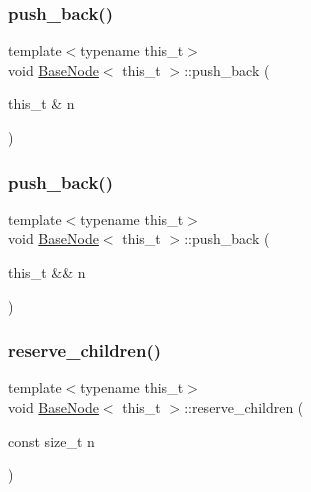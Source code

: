 \subsubsection{\texorpdfstring{push\+\_\+back()}{push\_back()}\hspace{0.1cm}{\footnotesize\ttfamily [1/2]}}
{\footnotesize\ttfamily template$<$typename this\+\_\+t$>$ \\
void \hyperlink{class_base_node}{Base\+Node}$<$ this\+\_\+t $>$\+::push\+\_\+back (\begin{DoxyParamCaption}\item[{this\+\_\+t \&}]{n }\end{DoxyParamCaption})\hspace{0.3cm}{\ttfamily [inline]}}

\mbox{\label{class_base_node_a6971173d807967deda4501eb70676533}} 
\subsubsection{\texorpdfstring{push\+\_\+back()}{push\_back()}\hspace{0.1cm}{\footnotesize\ttfamily [2/2]}}
{\footnotesize\ttfamily template$<$typename this\+\_\+t$>$ \\
void \hyperlink{class_base_node}{Base\+Node}$<$ this\+\_\+t $>$\+::push\+\_\+back (\begin{DoxyParamCaption}\item[{this\+\_\+t \&\&}]{n }\end{DoxyParamCaption})\hspace{0.3cm}{\ttfamily [inline]}}

\mbox{\label{class_base_node_abb32a7d0574ed17ddeb61e7262d090ad}} 
\subsubsection{\texorpdfstring{reserve\+\_\+children()}{reserve\_children()}}
{\footnotesize\ttfamily template$<$typename this\+\_\+t$>$ \\
void \hyperlink{class_base_node}{Base\+Node}$<$ this\+\_\+t $>$\+::reserve\+\_\+children (\begin{DoxyParamCaption}\item[{const size\+\_\+t}]{n }\end{DoxyParamCaption})\hspace{0.3cm}{\ttfamily [inline]}}

